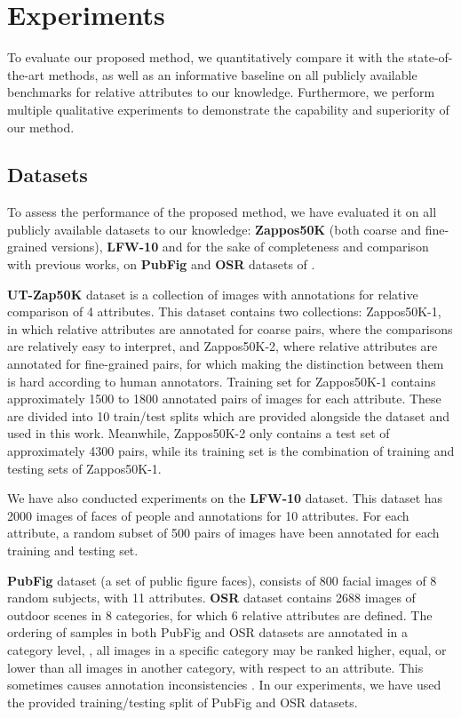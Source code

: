 \section{Experiments}\label{sec.4}

To evaluate our proposed method, we quantitatively compare it  with the state-of-the-art methods, as well as an informative baseline on all publicly available benchmarks for relative attributes to our knowledge. Furthermore, we perform multiple qualitative experiments to demonstrate the capability and superiority of our method.

\subsection{Datasets}\label{sec.4.1}

To assess the performance of the proposed method, we have evaluated it on all publicly available datasets to our knowledge: \textbf{Zappos50K} \cite{Yu2014} (both coarse and fine-grained versions), \textbf{LFW-10} \cite{Sandeep_2014_CVPR} and for the sake of completeness and comparison with previous works, on \textbf{PubFig} and \textbf{OSR} datasets of \cite{parikh2011}.

\textbf{UT-Zap50K} \cite{Yu2014} dataset is a collection of images with annotations for relative comparison of 4 attributes. This dataset contains two collections: Zappos50K-1, in which relative attributes are annotated for coarse pairs, where the comparisons are relatively easy to interpret, and Zappos50K-2, where relative attributes are annotated for fine-grained pairs, for which making the distinction between them is hard according to human annotators.
Training set for Zappos50K-1 contains approximately 1500 to 1800 annotated pairs of images for each attribute. These are divided into 10 train/test splits which are provided alongside the dataset and used in this work. Meanwhile, Zappos50K-2 only contains a test set of approximately 4300 pairs, while its training set is the combination of training and testing sets of Zappos50K-1.

We have also conducted experiments on the \textbf{LFW-10} \cite{Sandeep_2014_CVPR} dataset. This dataset has 2000 images of faces of people and annotations for 10 attributes. For each attribute, a random subset of 500 pairs of images have been annotated for each training and testing set.

\textbf{PubFig} \cite{parikh2011} dataset (a set of public figure faces), consists of 800 facial images of 8 random subjects, with 11 attributes.
\textbf{OSR} \cite{parikh2011} dataset contains 2688 images of outdoor scenes in 8 categories, for which 6 relative attributes are defined.
The ordering of samples in both PubFig and OSR datasets are annotated in a category level, \ie, all images in a specific category may be ranked higher, equal, or lower than all images in another category, with respect to an attribute. This sometimes causes annotation inconsistencies \cite{Sandeep_2014_CVPR}.
In our experiments, we have used the provided training/testing split of PubFig and OSR datasets.


